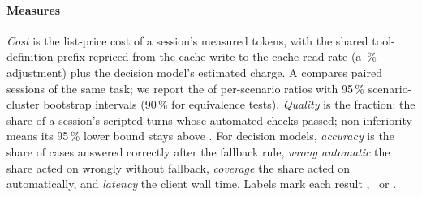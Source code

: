 \paragraph{Measures} \emph{Cost} is the list-price cost of a session's measured tokens, with the shared
tool-definition prefix repriced from the cache-write to the cache-read rate (a \NormShareMain\,\% adjustment) plus the
decision model's estimated charge. A  compares paired sessions of the same task; we report the
 of per-scenario ratios with 95\,\% scenario-cluster bootstrap intervals (90\,\% for
equivalence tests). \emph{Quality} is the  fraction: the share of a session's scripted turns whose
automated checks passed; non-inferiority means its 95\,\% lower bound stays above \NIMargin. For decision models,
\emph{accuracy} is the share of cases answered correctly after the fallback rule, \emph{wrong automatic} the share
acted on wrongly without fallback, \emph{coverage} the share acted on automatically, and \emph{latency} the client
wall time. Labels mark each result \prereg, \posthoc\ or \expl.
